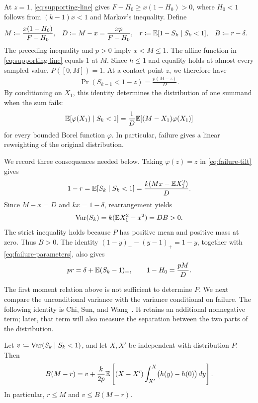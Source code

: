 At $z=1$, \cref{eq:supporting-line} gives $F-H_0\ge x(1-H_0)>0$, where $H_0<1$ follows from $(k-1)x<1$ and Markov's inequality.
Define
\begin{align}
 M&\coloneqq\frac{x(1-H_0)}{F-H_0},
 &D&\coloneqq M-x=\frac{xp}{F-H_0},
 &r&\coloneqq\mathbb E[1-S_k\mid S_k<1],
 &B&\coloneqq r-\delta.
 \label{eq:failure-parameters}
\end{align}
The preceding inequality and $p>0$ imply $x<M\le1$.
The affine function in \cref{eq:supporting-line} equals $1$ at $M$.
Since $h\le1$ and equality holds at almost every sampled value, $P([0,M])=1$.
At a contact point $z$, we therefore have
\begin{align}
 \Pr(S_{k-1}<1-z)=\frac{p(M-z)}D.
 \label{eq:contact-failure}
\end{align}
By conditioning on $X_1$, this identity determines the distribution of one summand when the sum fails:
\begin{align}
 \mathbb E[\varphi(X_1)\mid S_k<1]
 =\frac1D\mathbb E[(M-X_1)\varphi(X_1)]
 \label{eq:failure-tilt}
\end{align}
for every bounded Borel function $\varphi$.
In particular, failure gives a linear reweighting of the original distribution.

We record three consequences needed below.
Taking $\varphi(z)=z$ in \cref{eq:failure-tilt} gives
\begin{align*}
 1-r=\mathbb E[S_k\mid S_k<1]
 =\frac{k(Mx-\mathbb E X_1^2)}D.
\end{align*}
Since $M-x=D$ and $kx=1-\delta$, rearrangement yields
\begin{align}
 \operatorname{Var}(S_k)=k(\mathbb E X_1^2-x^2)=DB>0.
 \label{eq:unconditional-variance}
\end{align}
The strict inequality holds because $P$ has positive mean and positive mass at zero.
Thus $B>0$.
The identity $(1-y)_+-(y-1)_+=1-y$, together with \cref{eq:failure-parameters}, also gives
\begin{align}
 pr=\delta+\mathbb E(S_k-1)_+,
 \qquad 1-H_0=\frac{pM}D.
 \label{eq:failure-identities}
\end{align}

The first moment relation above is not sufficient to determine $P$.
We next compare the unconditional variance with the variance conditional on failure.
The following identity is Chi, Sun, and Wang~\cite[Lemma 4.3]{CSW2026}. It retains an additional nonnegative term; later, that term will also measure the separation between the two parts of the distribution.

\begin{lemma}\label{lem:covariance}
Let $v\coloneqq\operatorname{Var}(S_k\mid S_k<1)$, and let $X,X'$ be independent with distribution $P$.
Then
\begin{align}
 B(M-r)
 =v+\frac{k}{2p}\mathbb E\left[(X-X')\int_{X'}^X\bigl(h(y)-h(0)\bigr)\,dy\right].
 \label{eq:covariance-identity}
\end{align}
In particular, $r\le M$ and $v\le B(M-r)$.
\end{lemma}


